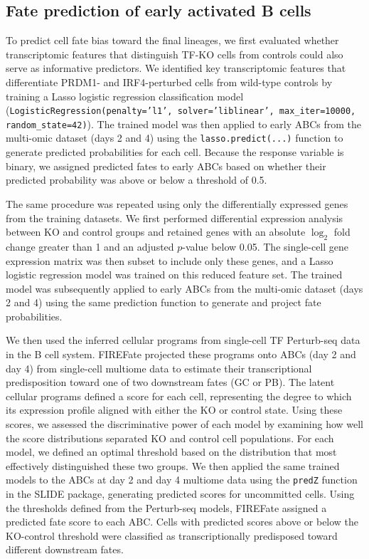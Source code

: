\documentclass[11pt]{article}
\begin{document}

\subsection*{Fate prediction of early activated B cells}

To predict cell fate bias toward the final lineages, we first evaluated whether
transcriptomic features that distinguish TF-KO cells from controls could also serve as
informative predictors. We identified key transcriptomic features that differentiate
PRDM1- and IRF4-perturbed cells from wild-type controls by training a Lasso logistic
regression classification model (\texttt{LogisticRegression(penalty='l1',
solver='liblinear', max\_iter=10000, random\_state=42)}). The trained model was then
applied to early ABCs from the multi-omic dataset (days 2 and 4) using the
\texttt{lasso.predict(...)} function to generate predicted probabilities for each cell.
Because the response variable is binary, we assigned predicted fates to early ABCs based
on whether their predicted probability was above or below a threshold of 0.5.

The same procedure was repeated using only the differentially expressed genes from the
training datasets. We first performed differential expression analysis between KO and
control groups and retained genes with an absolute $\log_{2}$ fold change greater than 1
and an adjusted $p$-value below 0.05. The single-cell gene expression matrix was then
subset to include only these genes, and a Lasso logistic regression model was trained on
this reduced feature set. The trained model was subsequently applied to early ABCs from
the multi-omic dataset (days 2 and 4) using the same prediction function to generate and
project fate probabilities.

We then used the inferred cellular programs from single-cell TF Perturb-seq data in the
B cell system. FIREFate projected these programs onto ABCs (day 2 and day 4) from
single-cell multiome data to estimate their transcriptional predisposition toward one of
two downstream fates (GC or PB). The latent cellular programs defined a score for each
cell, representing the degree to which its expression profile aligned with either the KO
or control state. Using these scores, we assessed the discriminative power of each model
by examining how well the score distributions separated KO and control cell populations.
For each model, we defined an optimal threshold based on the distribution that most
effectively distinguished these two groups. We then applied the same trained models to
the ABCs at day 2 and day 4 multiome data using the \texttt{predZ} function in the SLIDE
package, generating predicted scores for uncommitted cells. Using the thresholds defined
from the Perturb-seq models, FIREFate assigned a predicted fate score to each ABC. Cells
with predicted scores above or below the KO-control threshold were classified as
transcriptionally predisposed toward different downstream fates.
\end{document}
